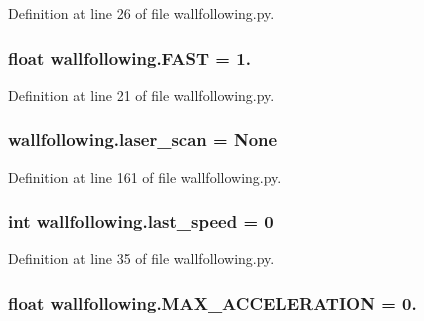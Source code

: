 Definition at line 26 of file wallfollowing.\+py.

\subsubsection[{\texorpdfstring{F\+A\+ST}{FAST}}]{\setlength{\rightskip}{0pt plus 5cm}float wallfollowing.\+F\+A\+ST = 1.}\hypertarget{namespacewallfollowing_ab1e7c06b4efb8e38a97ac8ec783a6beb}{}\label{namespacewallfollowing_ab1e7c06b4efb8e38a97ac8ec783a6beb}


Definition at line 21 of file wallfollowing.\+py.

\subsubsection[{\texorpdfstring{laser\+\_\+scan}{laser_scan}}]{\setlength{\rightskip}{0pt plus 5cm}wallfollowing.\+laser\+\_\+scan = None}\hypertarget{namespacewallfollowing_a35ff373c811db70d98205347a736c606}{}\label{namespacewallfollowing_a35ff373c811db70d98205347a736c606}


Definition at line 161 of file wallfollowing.\+py.

\subsubsection[{\texorpdfstring{last\+\_\+speed}{last_speed}}]{\setlength{\rightskip}{0pt plus 5cm}int wallfollowing.\+last\+\_\+speed = 0}\hypertarget{namespacewallfollowing_a9ee8d77a4629b5d8ecb2899da6e3a7fe}{}\label{namespacewallfollowing_a9ee8d77a4629b5d8ecb2899da6e3a7fe}


Definition at line 35 of file wallfollowing.\+py.

\subsubsection[{\texorpdfstring{M\+A\+X\+\_\+\+A\+C\+C\+E\+L\+E\+R\+A\+T\+I\+ON}{MAX_ACCELERATION}}]{\setlength{\rightskip}{0pt plus 5cm}float wallfollowing.\+M\+A\+X\+\_\+\+A\+C\+C\+E\+L\+E\+R\+A\+T\+I\+ON = 0.}\hypertarget{namespacewallfollowing_acc4e21a1971c33663609d022c899c167}{}\label{namespacewallfollowing_acc4e21a1971c33663609d022c899c167}


